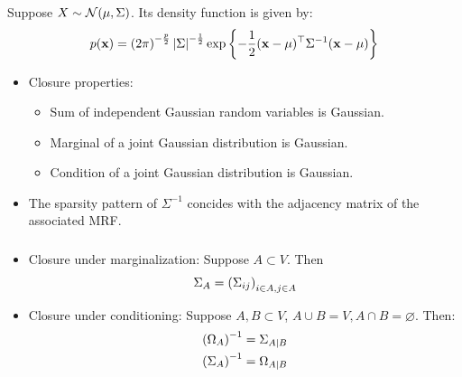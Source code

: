 \begin{frame}[fragile] \frametitle{}

    Suppose $X \sim \mathcal{N}(\mu, \Sigma)$. Its density function is given by:
	$$
    p(\mathbf{x}) = \left(2\pi\right)^{-\frac{p}{2}}\left|\Sigma\right|^{-\frac{1}{2}}
    \exp\left\{-\frac{1}{2}(\mathbf{x} - \mathbf{\mu})^\top \Sigma^{-1}
    (\mathbf{x} - \mathbf{\mu})\right\}
    $$
    \vspace{-0.7cm}
    \begin{itemize}
        \item Closure properties:
            \begin{itemize}
                \item Sum of independent Gaussian random variables is Gaussian.
                \item Marginal of a joint Gaussian distribution is Gaussian.
                \item Condition of a joint Gaussian distribution is Gaussian.
            \end{itemize}
        \item The sparsity pattern of $\Sigma^{-1}$ concides with the adjacency
            matrix of the associated MRF.
    \end{itemize}
\end{frame}
\begin{frame}[fragile] \frametitle{}

	\begin{itemize}
        \item Closure under marginalization:  Suppose $A \subset V$.  Then
            $$
            \Sigma_{A} = \left(\Sigma_{ij}\right)_{i\in A, j \in A}
            $$
        \item Closure under conditioning: Suppose  $A, B \subset V$, $A \cup B
            = V, A \cap B = \varnothing$.  Then:
            \begin{align*}
                \left( \Omega_A \right) ^{-1}  &= \Sigma_{A|B}   \\
                \left( \Sigma_A \right) ^{-1}  &= \Omega_{A|B}   \\
            \end{align*}
	\end{itemize}
\end{frame}
